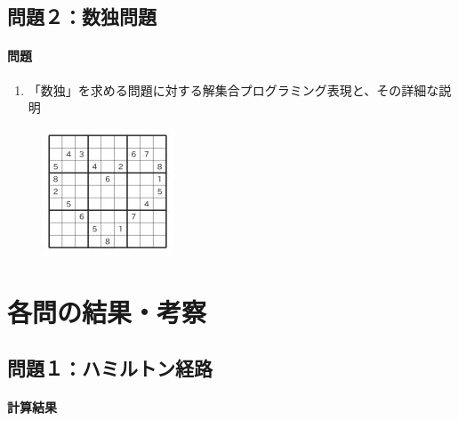 \documentclass[dvipdfmx]{jsarticle}
\begin{document}
\subsection{問題２：数独問題}
\paragraph{問題}
\begin{enumerate}
  \item 「数独」を求める問題に対する解集合プログラミング表現と、その詳細な説明
\end{enumerate}
\begin{figure}[H]
  \centering
  \includegraphics[scale=1.2]{images/sudoku.JPG}
\end{figure}

\section{各問の結果・考察}
\subsection{問題１：ハミルトン経路}
\paragraph{計算結果}
\end{document}
